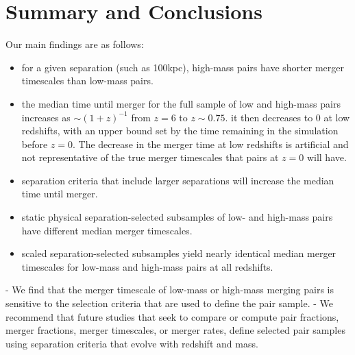 \documentclass[twocolumn,linenumbers]{aastex631}
\begin{document}
\section{Summary and Conclusions}


Our main findings are as follows: 
\begin{itemize}
    \item for a given separation (such as 100kpc), high-mass pairs have shorter merger timescales than low-mass pairs. 
    \item the median time until merger for the full sample of low and high-mass pairs increases as $\sim(1+z)^{-1}$ from $z=6$ to $z\sim0.75$. it then decreases to 0 at low redshifts, with an upper bound set by the time remaining in the simulation before $z=0$. The decrease in the merger time at low redshifts is artificial and not representative of the true merger timescales that pairs at $z=0$ will have.
    \item separation criteria that include larger separations will increase the median time until merger.
    \item static physical separation-selected subsamples of low- and high-mass pairs have different median merger timescales.
    \item scaled separation-selected subsamples yield nearly identical median merger timescales for low-mass and high-mass pairs at all redshifts. 
\end{itemize}

- We find that the merger timescale of low-mass or high-mass merging pairs is sensitive to the selection criteria that are used to define the pair sample.
- We recommend that future studies that seek to compare or compute pair fractions, merger fractions, merger timescales, or merger rates, define selected pair samples using separation criteria that evolve with redshift and mass. 














{}

\end{document}
